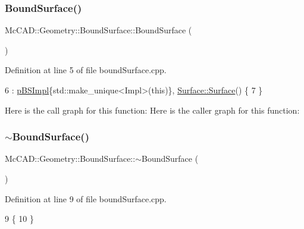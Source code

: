 \subsubsection{\texorpdfstring{Bound\+Surface()}{BoundSurface()}\hspace{0.1cm}{\footnotesize\ttfamily [1/2]}}
{\footnotesize\ttfamily Mc\+C\+A\+D\+::\+Geometry\+::\+Bound\+Surface\+::\+Bound\+Surface (\begin{DoxyParamCaption}{ }\end{DoxyParamCaption})}



Definition at line 5 of file bound\+Surface.\+cpp.


\begin{DoxyCode}
6   : \hyperlink{classMcCAD_1_1Geometry_1_1BoundSurface_ae678fabb46e22b7a68a336051b366ddf}{pBSImpl}\{std::make\_unique<Impl>(\textcolor{keyword}{this})\}, \hyperlink{classMcCAD_1_1Geometry_1_1Surface_af8c5757177e043d499b55b9e1d065a66}{Surface::Surface}() \{
7 \}
\end{DoxyCode}
Here is the call graph for this function\+:
Here is the caller graph for this function\+:
\mbox{\label{classMcCAD_1_1Geometry_1_1BoundSurface_ad3aa6d10d1c8e652b2100d73e7be38a2}} 
\subsubsection{\texorpdfstring{$\sim$\+Bound\+Surface()}{~BoundSurface()}\hspace{0.1cm}{\footnotesize\ttfamily [1/2]}}
{\footnotesize\ttfamily Mc\+C\+A\+D\+::\+Geometry\+::\+Bound\+Surface\+::$\sim$\+Bound\+Surface (\begin{DoxyParamCaption}{ }\end{DoxyParamCaption})}



Definition at line 9 of file bound\+Surface.\+cpp.


\begin{DoxyCode}
9                                         \{
10 \}
\end{DoxyCode}
\mbox{\label{classMcCAD_1_1Geometry_1_1BoundSurface_a50af5d5cd7cc2a92400422f57988d137}} 
